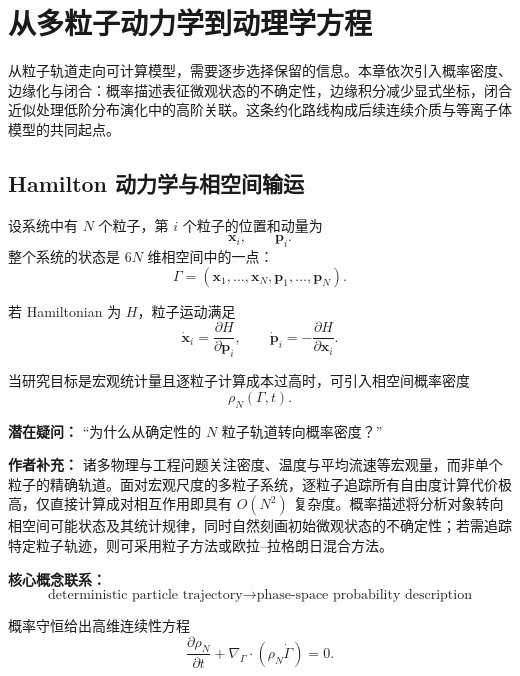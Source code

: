 \chapter{从多粒子动力学到动理学方程}\label{ch:1}

\begin{chaptersummary}
从粒子轨道走向可计算模型，需要逐步选择保留的信息。本章依次引入概率密度、边缘化与闭合：概率描述表征微观状态的不确定性，边缘积分减少显式坐标，闭合近似处理低阶分布演化中的高阶关联。这条约化路线构成后续连续介质与等离子体模型的共同起点。
\end{chaptersummary}

\section{Hamilton 动力学与相空间输运}
设系统中有 \(N\) 个粒子，第 \(i\) 个粒子的位置和动量为
\[
\bm x_i,\qquad \bm p_i.
\]
整个系统的状态是 \(6N\) 维相空间中的一点：
\[
\Gamma=
(\bm x_1,\dots,\bm x_N,\bm p_1,\dots,\bm p_N).
\]

若 Hamiltonian 为 \(H\)，粒子运动满足
\[
\dot{\bm x}_i=\frac{\partial H}{\partial \bm p_i},
\qquad
\dot{\bm p}_i=-\frac{\partial H}{\partial \bm x_i}.
\]

当研究目标是宏观统计量且逐粒子计算成本过高时，可引入相空间概率密度
\[
\rho_N(\Gamma,t).
\]

\begin{authornote}
\textbf{潜在疑问：}
“为什么从确定性的 \(N\) 粒子轨道转向概率密度？”

\textbf{作者补充：}
诸多物理与工程问题关注密度、温度与平均流速等宏观量，而非单个粒子的精确轨道。面对宏观尺度的多粒子系统，逐粒子追踪所有自由度计算代价极高，仅直接计算成对相互作用即具有 $O(N^2)$ 复杂度。概率描述将分析对象转向相空间可能状态及其统计规律，同时自然刻画初始微观状态的不确定性；若需追踪特定粒子轨迹，则可采用粒子方法或欧拉--拉格朗日混合方法。

\textbf{核心概念联系：}
\[
\text{deterministic particle trajectory}
\longrightarrow
\text{phase-space probability description}
\]
\end{authornote}

概率守恒给出高维连续性方程
\[
\frac{\partial \rho_N}{\partial t}
+
\nabla_\Gamma\cdot(\rho_N\dot\Gamma)=0.
\]

